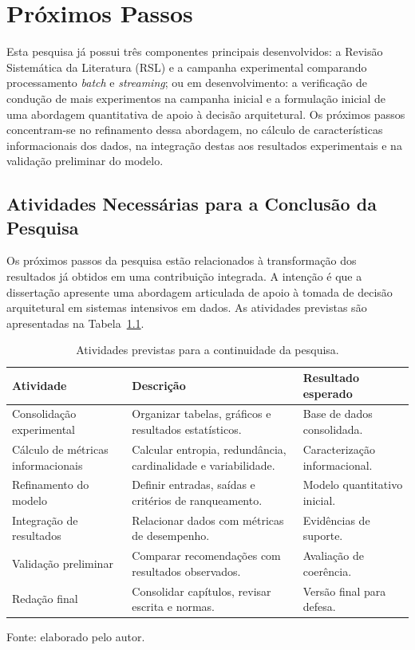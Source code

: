 \chapter{Próximos Passos}
\label{cap:proximos-passos}
Esta pesquisa já possui três componentes principais desenvolvidos: a Revisão Sistemática da Literatura (RSL) e a campanha experimental comparando processamento \textit{batch} e \textit{streaming}; ou em desenvolvimento: a verificação de condução de mais experimentos na campanha inicial e a formulação inicial de uma abordagem quantitativa de apoio à decisão arquitetural. Os próximos passos concentram-se no refinamento dessa abordagem, no cálculo de características informacionais dos dados, na integração destas aos resultados experimentais e na validação preliminar do modelo.

\section{Atividades Necessárias para a Conclusão da Pesquisa}
\label{sec:atividades-conclusao}
Os próximos passos da pesquisa estão relacionados à transformação dos resultados já obtidos em uma contribuição integrada. A intenção é que a dissertação apresente uma abordagem articulada de apoio à tomada de decisão arquitetural em sistemas intensivos em dados. As atividades previstas são apresentadas na Tabela~\ref{tab:proximos-passos}.

\begin{table}[htbp]
\centering
\caption{Atividades previstas para a continuidade da pesquisa.}
\label{tab:proximos-passos}
\small
\begin{tabular}{p{4cm} p{5.5cm} p{4cm}}
\toprule
\textbf{Atividade} & \textbf{Descrição} & \textbf{Resultado esperado} \\
\midrule
Consolidação experimental & Organizar tabelas, gráficos e resultados estatísticos. & Base de dados consolidada. \\
Cálculo de métricas informacionais & Calcular entropia, redundância, cardinalidade e variabilidade. & Caracterização informacional. \\
Refinamento do modelo & Definir entradas, saídas e critérios de ranqueamento. & Modelo quantitativo inicial. \\
Integração de resultados & Relacionar dados com métricas de desempenho. & Evidências de suporte. \\
Validação preliminar & Comparar recomendações com resultados observados. & Avaliação de coerência. \\
Redação final & Consolidar capítulos, revisar escrita e normas. & Versão final para defesa. \\
\bottomrule
\end{tabular}\vspace{0.3em}
\begin{flushleft}
\footnotesize Fonte: elaborado pelo autor.
\end{flushleft}\end{table}

